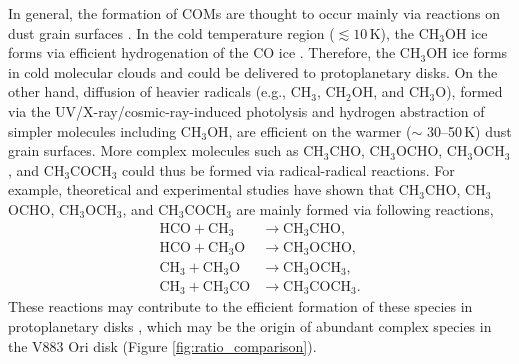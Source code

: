 \documentclass[linenumbers, twocolumn, twocolappendix, astrosymb, times]{aastex631}
\newcommand{\methanol}{CH$_3$OH\xspace}
\newcommand{\acetaldehyde}{CH$_3$CHO\xspace}
\newcommand{\methylformate}{CH$_3$OCHO\xspace}
\newcommand{\dimethylether}{CH$_3$OCH$_3$\xspace}
\newcommand{\acetone}{CH$_3$COCH$_3$\xspace}
\begin{document}
In general, the formation of COMs are thought to occur mainly via reactions on dust grain surfaces \citep[][and references therein]{Herbst2009}. In the cold temperature region ($\lesssim 10$\,K), the \methanol ice forms via efficient hydrogenation of the CO ice \citep[e.g.,][]{Tielens1982, Watanabe2002, Watanabe2003}. Therefore, the \methanol ice forms in cold molecular clouds and could be delivered to protoplanetary disks. On the other hand, 
diffusion of heavier radicals (e.g., CH$_3$, CH$_2$OH, and CH$_3$O), formed via the UV/X-ray/cosmic-ray-induced photolysis and hydrogen abstraction of simpler molecules including \methanol, are efficient on the warmer ($\sim$ 30--50\,K) dust grain surfaces. More complex molecules such as \acetaldehyde, \methylformate, \dimethylether, and \acetone could thus be formed via radical-radical reactions.
For example, theoretical and experimental studies \citep[e.g.,][]{Garrod2006, Chuang2016} have shown that \acetaldehyde, \methylformate, \dimethylether, and \acetone are mainly formed via following reactions,
\begin{align}
    \mathrm{HCO} + \mathrm{CH_3} &\longrightarrow \mathrm{CH_3CHO}, \label{eq:r-r_reaction1} \\ 
    \mathrm{HCO} + \mathrm{CH_3O} &\longrightarrow \mathrm{CH_3OCHO}, \label{eq:r-r_reaction2} \\
    \mathrm{CH_3} + \mathrm{CH_3O} &\longrightarrow \mathrm{CH_3OCH_3}, \label{eq:r-r_reaction3} \\
    \mathrm{CH_3} + \mathrm{CH_3CO} &\longrightarrow \mathrm{CH_3COCH_3}. \label{eq:r-r_reaction4}
\end{align}
These reactions may contribute to the efficient formation of these species in protoplanetary disks \citep{Walsh2014, Furuya2014}, which may be the origin of abundant complex species in the V883 Ori disk (Figure \ref{fig:ratio_comparison}).

\end{document}
